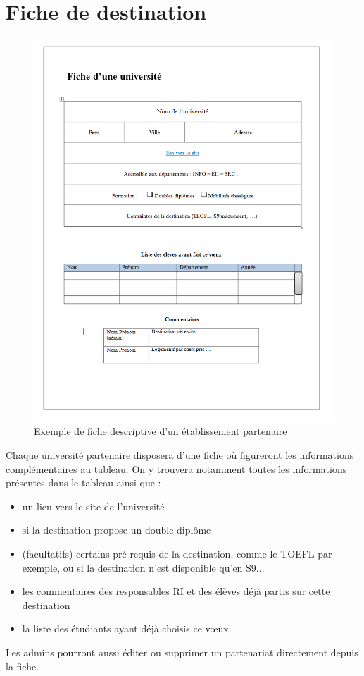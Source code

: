  \section{Fiche de destination}
 \label{sec::sheet_univ}
 
 \begin{figure}[H]
 	\centerline{\includegraphics[scale=0.5]{Universites/ficheUniv.png}}
 	\caption{Exemple de fiche descriptive d'un établissement partenaire}
 \end{figure}
 
 Chaque université partenaire disposera d'une fiche où figureront les informations complémentaires au tableau.
 On y trouvera notamment toutes les informations présentes dans le tableau ainsi que :
 \begin{itemize}
 	\item un lien vers le site de l'université
 	\item si la destination propose un double diplôme
 	\item (facultatifs) certains pré requis de la destination, comme le TOEFL par exemple, ou si la destination n'est disponible qu'en S9...
 	\item les commentaires des responsables RI et des élèves déjà partis sur cette destination
 	\item la liste des étudiants ayant déjà choisis ce vœux
 \end{itemize}
 

 
 Les admins pourront aussi éditer ou supprimer un partenariat directement depuis la fiche.